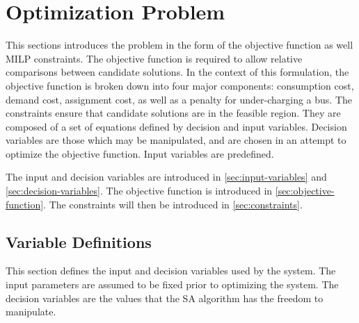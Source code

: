 \documentclass[11pt,a4paper,final]{article}
\begin{document}
\section{Optimization Problem}
\label{sec:optimization-problem}
This sections introduces the problem in the form of the objective function as well MILP constraints. The objective
function is required to allow relative comparisons between candidate solutions. In the context of this formulation, the
objective function is broken down into four major components: consumption cost, demand cost, assignment cost, as well as
a penalty for under-charging a bus. The constraints ensure that candidate solutions are in the feasible region. They are
composed of a set of equations defined by decision and input variables. Decision variables are those which may be
manipulated, and are chosen in an attempt to optimize the objective function. Input variables are predefined.

The input and decision variables are introduced in \ref{sec:input-variables} and \ref{sec:decision-variables}. The
objective function is introduced in \ref{sec:objective-function}. The constraints will then be introduced in
\ref{sec:constraints}.

\subsection{Variable Definitions}
\label{sec:parameter-definitions}
This section defines the input and decision variables used by the system. The input parameters are assumed to be fixed
prior to optimizing the system. The decision variables are the values that the SA algorithm has the freedom to
manipulate.
\end{document}
